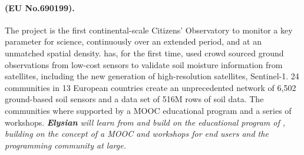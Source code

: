 \documentclass[a4paper,11pt]{article}
\newcommand{\project}[1]{\textbf{#1}\xspace}
\newcommand{\SECURITY}{\project{Elysian}}
\newcommand{\TheProject}{\SECURITY}
\begin{document}


\begin{mdframed}[backgroundcolor=blue!5]
\paragraph{\grow (EU No.690199).}
The \grow project is the first continental-scale Citizens’ Observatory to monitor a key parameter for science, continuously over an extended period, and at an unmatched spatial density. \grow has, for the first time, used crowd sourced ground observations from low-cost sensors to validate soil moisture information from satellites, including the new generation of high-resolution satellites, Sentinel-1. 24 \grow communities in 13 European countries create an unprecedented network of 6,502 ground-based soil sensors and a data set of 516M rows of soil data. The communities where supported by a MOOC educational program and a series of workshops. \emph{\TheProject{} will learn from and build on the educational program of \grow, building on the concept of a MOOC and workshops for end users and the programming community at large.}
\end{mdframed}
\end{document}
